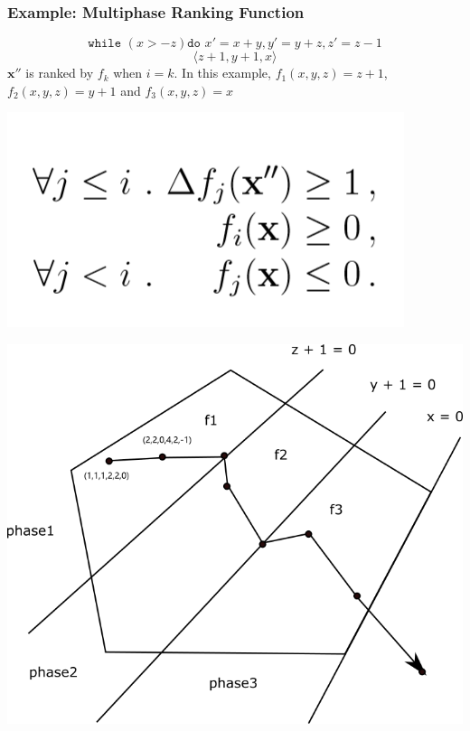 \documentclass[11pt]{beamer}
\begin{document}
\begin{frame}\frametitle{Example: Multiphase Ranking Function}
\[\texttt{while }( x > -z) \texttt{do } x' = x + y, y' = y + z, z' = z - 1\]
\[\langle z + 1, y + 1, x \rangle\]
$\textbf{x}''$ is ranked by $f_k$ when $i = k$. In this example, $f_1(x, y, z) = z + 1$, $f_2(x, y, z) = y + 1$ and $f_3(x, y, z) = x$
\begin{center}
\includegraphics[scale = 0.2]{3.PNG}

\includegraphics[scale = 0.28]{divide.png}
\end{center}
\end{frame}
\end{document}
